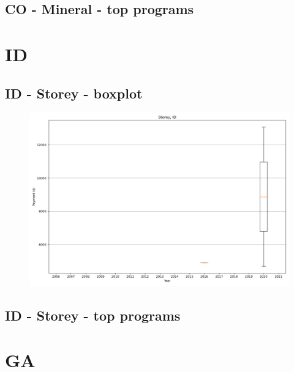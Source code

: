 \subsection*{CO - Mineral - top programs}

\newpage
\section*{ID}
\subsection*{ID - Storey - boxplot}
\begin{figure}[h]
\centering
\includegraphics[width=7in]{../output/boxplots/counties/Storey-ID_boxplot.png}
\end{figure}


\subsection*{ID - Storey - top programs}

\newpage
\section*{GA}
